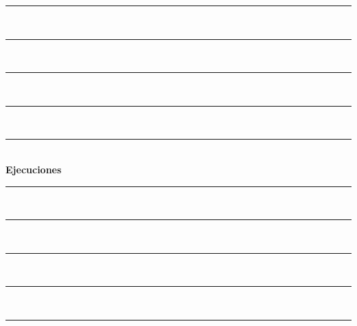 \documentclass[10pt,letterpaper]{article}
\begin{document}
\newpage 
\begin{center}
\newcommand{\HRule}{\rule{\linewidth}{0.5mm}}
\center
\HRule\\[6cm]
\HRule\\[0.4cm]
\HRule\\[0.4cm]
\HRule\\[0.4cm]
\HRule\\[0.4cm]
{\centering \Huge\bfseries Ejecuciones}\\[0.4cm]
\HRule\\[0.4cm]
\HRule\\[0.4cm]
\HRule\\[0.4cm]
\HRule\\[6cm]
\HRule
\end{center}
\newpage 
{}
\end{document}
